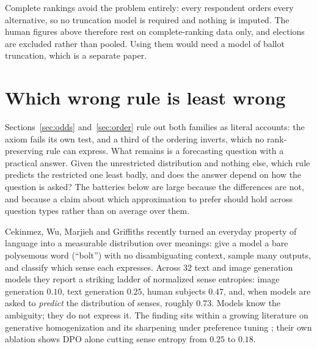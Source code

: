 \documentclass[11pt]{article}
\begin{document}
Complete rankings avoid the problem entirely: every respondent orders every
alternative, so no truncation model is required and nothing is imputed. The human
figures above therefore rest on complete-ranking data only, and elections are
excluded rather than pooled. Using them would need a model of ballot truncation,
which is a separate paper.

\section{Which wrong rule is least wrong}
\label{sec:polysemy}

Sections~\ref{sec:odds} and~\ref{sec:order} rule out both families as literal
accounts: the axiom fails its own test, and a third of the ordering inverts,
which no rank-preserving rule can express. What remains is a forecasting
question with a practical answer. Given the unrestricted distribution and
nothing else, which rule predicts the restricted one least badly, and does the
answer depend on how the question is asked? The batteries below are large
because the differences are not, and because a claim about which approximation
to prefer should hold across question types rather than on average over them.

Cekinmez, Wu, Marjieh and Griffiths \cite{cekinmez2026} recently turned an
everyday property of language into a measurable distribution over
meanings: give a model a bare polysemous word (``bolt'') with no
disambiguating context, sample many outputs, and classify which sense each
expresses. Across 32 text and image generation models they report a
striking ladder of normalized sense entropies: image generation $0.10$,
text generation $0.25$, human subjects $0.47$, and, when models are asked
to \emph{predict} the distribution of senses, roughly $0.73$. Models
know the ambiguity; they do not express it. The finding sits within a
growing literature on generative homogenization \cite{jiang2026} and its
sharpening under preference tuning \cite{kirk2024}; their own ablation
shows DPO alone cutting sense entropy from $0.25$ to $0.18$.
\end{document}
